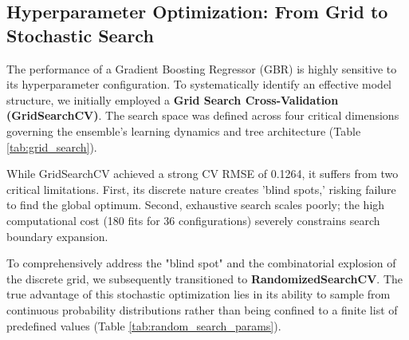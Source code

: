 \documentclass{article}
\begin{document}
\subsection{Hyperparameter Optimization: From Grid to Stochastic Search}

The performance of a Gradient Boosting Regressor (GBR) is highly sensitive to its hyperparameter configuration. To systematically identify an effective model structure, we initially employed a \textbf{Grid Search Cross-Validation (GridSearchCV)}. The search space was defined across four critical dimensions governing the ensemble's learning dynamics and tree architecture (Table \ref{tab:grid_search}). 

\begin{table}[H]
    \centering
    \renewcommand{\arraystretch}{1.2}
    \caption{GridSearchCV parameter space and optimal configuration.}
    \label{tab:grid_search}
\end{table}

While GridSearchCV achieved a strong CV RMSE of 0.1264, it suffers from two critical limitations. First, its discrete nature creates 'blind spots,' risking failure to find the global optimum. Second, exhaustive search scales poorly; the high computational cost (180 fits for 36 configurations) severely constrains search boundary expansion.

To comprehensively address the "blind spot" and the combinatorial explosion of the discrete grid, we subsequently transitioned to \textbf{RandomizedSearchCV}. The true advantage of this stochastic optimization lies in its ability to sample from continuous probability distributions rather than being confined to a finite list of predefined values (Table \ref{tab:random_search_params}).
\end{document}
